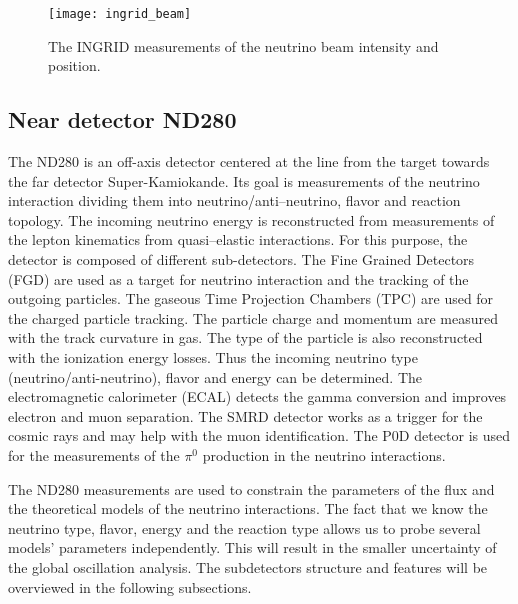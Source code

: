 \documentclass[../main.tex]{subfiles}
\begin{document}
\begin{figure}[!ht]
  \centering
  \texttt{[image: ingrid\_beam]}
  \caption{The INGRID measurements of the neutrino beam intensity and position.}
  \label{fig:t2k:ingrid_beam}
\end{figure}

\subsection{Near detector ND280}
\label{sec:T2K:nd280}
The ND280 is an off-axis detector centered at the line from the target towards the far detector Super-Kamiokande. Its goal is measurements of the neutrino interaction dividing them into neutrino/anti--neutrino, flavor and reaction topology. The incoming neutrino energy is reconstructed from measurements of the lepton kinematics from quasi--elastic interactions. For this purpose, the detector is composed of different sub-detectors. The Fine Grained Detectors (FGD) are used as a target for neutrino interaction and the tracking of the outgoing particles. The gaseous Time Projection Chambers (TPC) are used for the charged particle tracking. The particle charge and momentum are measured with the track curvature in gas. The type of the particle is also reconstructed with the ionization energy losses. Thus the incoming neutrino type (neutrino/anti-neutrino), flavor and energy can be determined. The electromagnetic calorimeter (ECAL) detects the gamma conversion and improves electron and muon separation. The SMRD detector works as a trigger for the cosmic rays and may help with the muon identification. The P0D detector is used for the measurements of the $\pi^0$ production in the neutrino interactions.

The ND280 measurements are used to constrain the parameters of the flux and the theoretical models of the neutrino interactions. The fact that we know the neutrino type, flavor, energy and the reaction type allows us to probe several models' parameters independently. This will result in the smaller uncertainty of the global oscillation analysis. The subdetectors structure and features will be overviewed in the following subsections.
\end{document}
